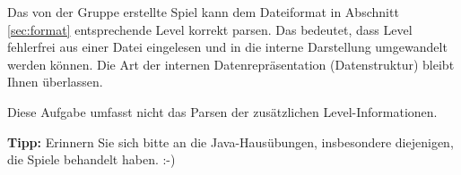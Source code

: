 Das von der Gruppe erstellte Spiel kann dem Dateiformat in Abschnitt
\vref{sec:format} entsprechende Level korrekt parsen. Das bedeutet, dass
Level fehlerfrei aus einer Datei eingelesen und in die interne Darstellung
umgewandelt werden k\"onnen. Die Art der internen Datenrepr\"asentation
(Datenstruktur) bleibt Ihnen \"uberlassen. 

Diese Aufgabe umfasst nicht das Parsen der zus\"atzlichen Level-Informationen.
 
\textbf{Tipp:} Erinnern Sie sich bitte an die Java-Haus\"ubungen,
insbesondere diejenigen, die Spiele behandelt haben. :-)
